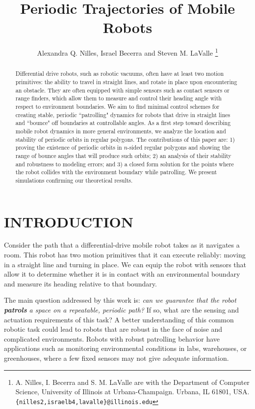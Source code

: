 \documentclass[letterpaper, 10 pt, conference]{ieeeconf}  %
\title{\LARGE \bf
Periodic Trajectories of Mobile Robots}
\author{Alexandra Q. Nilles, Israel Becerra and Steven M. LaValle%
\thanks{A. Nilles, I. Becerra and S. M. LaValle are with the Department of Computer Science, 
University of Illinois at Urbana-Champaign. Urbana, IL 61801, USA. 
        {\tt\small \{nilles2,israelb4,lavalle\}@illinois.edu}}%
}
\begin{document}
\maketitle
\thispagestyle{empty}
\pagestyle{empty}


\begin{abstract}

Differential drive robots, such as robotic vacuums, often have at least two motion
primitives: the ability to travel in straight lines, and rotate in place upon
encountering an obstacle. They are often equipped with simple sensors such as
contact sensors or range finders, which allow them to measure and control
their heading angle with respect to environment boundaries. 
We aim to find minimal control schemes for creating stable, periodic 
``patrolling" dynamics for robots that
drive in straight lines and ``bounce" off boundaries at controllable angles.
As a first step
toward describing mobile robot dynamics in more general environments, we analyze
the location and stability of periodic orbits in regular polygons.
The contributions of this paper are: 1) proving the existence of
periodic orbits in $n$-sided regular polygons and showing the range of bounce
angles that will produce such orbits; 2) an analysis of their stability and robustness to
modeling errors; and 3) a closed form solution for the points where the robot collides
with the environment boundary while patrolling. We present simulations confirming
our theoretical results.

\end{abstract}


\section{INTRODUCTION}

Consider the path that a differential-drive mobile robot takes as it navigates a room.
This robot has two motion primitives that it can execute reliably: moving in a straight
line and turning in place. We can equip the robot with sensors that allow it to
determine whether it is in contact with an environmental boundary and measure
its heading relative to that boundary.

The main question addressed by this work is: \textit{can we guarantee that the robot 
\textbf{patrols} a space on a repeatable, periodic path?} If so, what are the
 sensing and actuation requirements of this task? A better understanding of
this common robotic task could lead to robots that are robust in the face of
noise and complicated environments. Robots with
robust patrolling behavior have applications such as
monitoring environmental conditions in labs, warehouses, or greenhouses, where
a few fixed sensors may not give adequate information.
\end{document}
